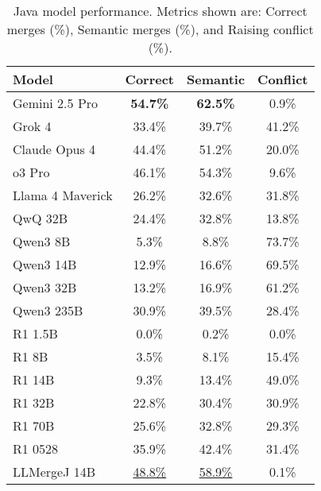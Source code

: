 \begin{table}[ht]
\centering
\footnotesize
\begin{tabular}{lccc}
\toprule
Model & Correct & Semantic & Conflict \\
\midrule
Gemini 2.5 Pro & \textbf{54.7\%} & \textbf{62.5\%} & 0.9\% \\
Grok 4 & 33.4\% & 39.7\% & 41.2\% \\
Claude Opus 4 & 44.4\% & 51.2\% & 20.0\% \\
o3 Pro & 46.1\% & 54.3\% & 9.6\% \\
Llama 4 Maverick & 26.2\% & 32.6\% & 31.8\% \\
QwQ 32B & 24.4\% & 32.8\% & 13.8\% \\
Qwen3 8B & 5.3\% & 8.8\% & 73.7\% \\
Qwen3 14B & 12.9\% & 16.6\% & 69.5\% \\
Qwen3 32B & 13.2\% & 16.9\% & 61.2\% \\
Qwen3 235B & 30.9\% & 39.5\% & 28.4\% \\
R1 1.5B & 0.0\% & 0.2\% & 0.0\% \\
R1 8B & 3.5\% & 8.1\% & 15.4\% \\
R1 14B & 9.3\% & 13.4\% & 49.0\% \\
R1 32B & 22.8\% & 30.4\% & 30.9\% \\
R1 70B & 25.6\% & 32.8\% & 29.3\% \\
R1 0528 & 35.9\% & 42.4\% & 31.4\% \\
LLMergeJ 14B & \underline{48.8\%} & \underline{58.9\%} & 0.1\% \\
\bottomrule
\end{tabular}
\caption{Java model performance. Metrics shown are: Correct merges (\%), Semantic merges (\%), and Raising conflict (\%).}
\label{tab:java-results}
\end{table}
